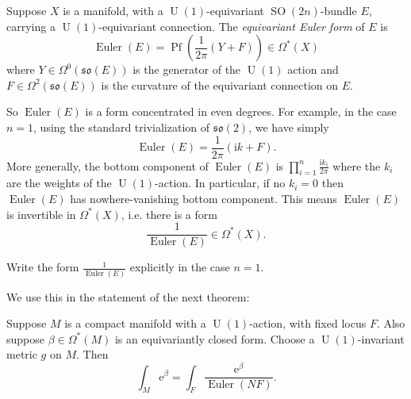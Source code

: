 \documentclass[12pt,letterpaper,reqno]{article}
\numberwithin{equation}{section}
\newcommand{\fso}{{\mathfrak {so}}}
\newcommand{\I}{{\mathrm i}}
\newcommand{\e}{{\mathrm e}}
\newcommand{\ti}[1]{\textit{#1}}
\DeclareMathOperator{\SO}{SO}
\DeclareMathOperator{\U}{U}
\DeclareMathOperator{\Pf}{Pf}
\DeclareMathOperator{\Euler}{Euler}
\newcommand{\fixme}[1]{{\color{orange}{[#1]}}}
\begin{document}
\begin{defn} Suppose $X$ is a manifold, with
a $\U(1)$-equivariant $\SO(2n)$-bundle $E$, carrying a 
$\U(1)$-equivariant connection. 
The \ti{equivariant Euler form} of $E$ is \fixme{check signs}
\begin{equation}
  \Euler(E) = \Pf\left(\frac{1}{2\pi} \left(Y + F\right) \right) \in \Omega^*(X)
\end{equation}
where $Y \in \Omega^0(\fso(E))$ is the generator of the $\U(1)$ action
and $F \in \Omega^2(\fso(E))$ is the curvature of the 
equivariant connection on $E$.
\end{defn}
So $\Euler(E)$ is a form concentrated in even degrees.
For example, in the case $n=1$, using the standard trivialization
of $\fso(2)$, we have simply
\begin{equation}
  \Euler(E) = \frac{1}{2\pi} (\I k + F).
\end{equation}
More generally, the bottom component of $\Euler(E)$ is
$\prod_{i=1}^n \frac{\I k_i}{2\pi}$ where the $k_i$ are the weights of the 
$\U(1)$-action. In particular, if no $k_i = 0$ then $\Euler(E)$
has nowhere-vanishing bottom component. This means $\Euler(E)$
is invertible in $\Omega^*(X)$, i.e.
there is a form
\begin{equation}
  \frac{1}{\Euler(E)} \in \Omega^*(X).
\end{equation}

\begin{exercise}
Write the form $\frac{1}{\Euler(E)}$ explicitly in the case $n=1$.
\end{exercise}

We use this in the statement of the next theorem:

\begin{thm} \label{thm:abbv}
Suppose $M$ is a compact manifold with a $\U(1)$-action, with fixed locus
$F$.
Also suppose $\beta \in \Omega^*(M)$ is an equivariantly closed form.
Choose a $\U(1)$-invariant metric $g$ on $M$. Then
\begin{equation}
\int_M \e^{\beta} = \int_F \frac{\e^{\beta}}{\Euler(NF)}.
\end{equation}
\end{thm}
\end{document}
